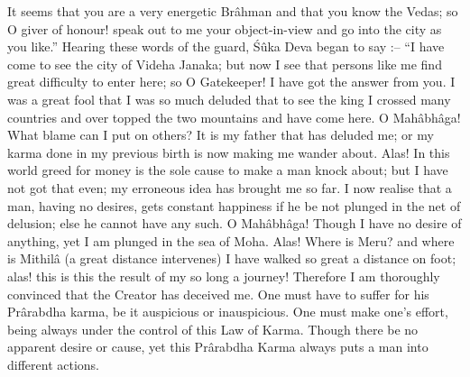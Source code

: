 It seems that you are a very energetic Br\^ahman and that you know the Vedas; so O giver of honour! speak out to me your object-in-view and go into the city as you like.'' Hearing these words of the guard, \'S\^uka Deva began to say :-- ``I have come to see the city of Videha Janaka; but now I see that persons like me find great difficulty to enter here; so O Gatekeeper! I have got the answer from you. I was a great fool that I was so much deluded that to see the king I crossed many countries and over topped the two mountains and have come here. O Mah\^abh\^aga! What blame can I put on others? It is my father that has deluded me; or my karma done in my previous birth is now making me wander about. Alas! In this world greed for money is the sole cause to make a man knock about; but I have not got that even; my erroneous idea has brought me so far. I now realise that a man, having no desires, gets constant happiness if he be not plunged in the net of delusion; else he cannot have any such. O Mah\^abh\^aga! Though I have no desire of anything, yet I am plunged in the sea of Moha. Alas! Where is Meru? and where is Mithil\^a (a great distance intervenes) I have walked so great a distance on foot; alas! this is this the result of my so long a journey! Therefore I am thoroughly convinced that the Creator has deceived me. One must have to suffer for his Pr\^arabdha karma, be it auspicious or inauspicious. One must make one’s effort, being always under the control of this Law of Karma. Though there be no apparent desire or cause, yet this Pr\^arabdha Karma always puts a man into different actions.


